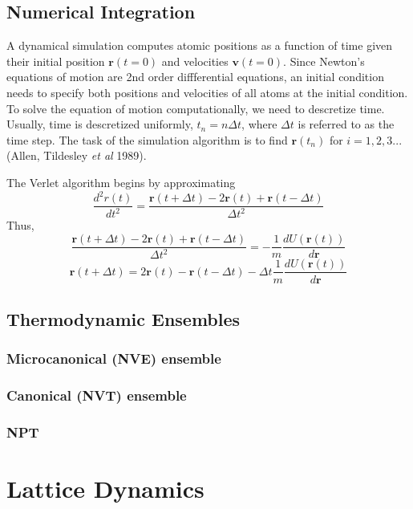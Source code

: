 \subsection{Numerical Integration}
A dynamical simulation computes atomic positions as a function of time given their initial position $\bm{r}(t=0)$ and velocities $\bm{v}(t=0)$.  Since Newton's equations of motion are 2nd order diffferential equations, an initial condition needs to specify both positions and velocities of all atoms at the initial condition.  To solve the equation of motion computationally, we need to descretize time.  Usually, time is descretized uniformly, $t_n=n\Delta t$, where $\Delta t$ is referred to as the time step.  The task of the simulation algorithm is to find $\bm{r}(t_n)$ for $i=1,2,3...$ (Allen, Tildesley \emph{et al} 1989).

The Verlet algorithm begins by approximating
\begin{equation}
	\frac{d^2 r(t)}
	     {dt^2}
	= \frac{\bm{r}(t+\Delta t) - 2\bm{r}(t) + \bm{r}(t-\Delta t)}
	       {\Delta t^2}
\end{equation}
Thus,
\begin{equation}
  \frac{\bm{r}(t+\Delta t) - 2\bm{r}(t) + \bm{r}(t-\Delta t)}
	     {\Delta t^2}
	=
	- \frac{1}{m} \frac{dU(\bm{r}(t))}{d\bm{r}}
\end{equation}
\begin{equation}
	\bm{r}(t+\Delta t)
	     = 2\bm{r}(t) - \bm{r}(t-\Delta t) - \Delta t \frac{1}{m} \frac{dU(\bm{r}(t))}{d\bm{r}}
\end{equation}


\subsection{Thermodynamic Ensembles}
\subsubsection{Microcanonical (NVE) ensemble}
\subsubsection{Canonical (NVT) ensemble}
\subsubsection{NPT}
\section{Lattice Dynamics}

